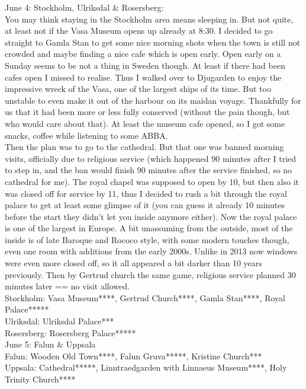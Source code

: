 June 4: Stockholm, Ulriksdal \& Rosersberg:\\
You may think staying in the Stockholm area means sleeping in. But not quite, at least not if the Vasa Museum opens up already at 8:30. I decided to go straight to Gamla Stan to get some nice morning shots when the town is still not crowded and maybe finding a nice cafe which is open early. Open early on a Sunday seems to be not a thing in Sweden though. At least if there had been cafes open I missed to realise. Thus I walked over to Djugarden to enjoy the impressive wreck of the Vasa, one of the largest ships of its time. But too unstable to even make it out of the harbour on its maidan voyage. Thankfully for us that it had been more or less fully conserved (without the pain though, but who would care about that). At least the museum cafe opened, so I got some snacks, coffee while listening to some ABBA.\\
Then the plan was to go to the cathedral. But that one was banned morning visits, officially due to religious service (which happened 90 minutes after I tried to step in, and the ban would finish 90 minutes after the service finished, so no cathedral for me). The royal chapel was supposed to open by 10, but then also it was closed off for service by 11, thus I decided to rush a bit through the royal palace to get at least some glimpse of it (you can guess it already 10 minutes before the start they didn't let you inside anymore either). Now the royal palace is one of the largest in Europe. A bit unassuming from the outside, most of the inside is of late Baroque and Rococo style, with some modern touches though, even one room with additions from the early 2000s. Unlike in 2013 now windows were even more closed off, so it all appeared a bit darker than 10 years previously. Then by Gertrud church the same game, religious service planned 30 minutes later == no visit allowed.\\

Stockholm: Vasa Museum****, Gertrud Church****, Gamla Stan****, Royal Palace*****\\
Ulriksdal: Ulriksdal Palace***\\
Rosersberg: Rosersberg Palace*****\\

June 5: Falun \& Uppsala\\

Falun: Wooden Old Town****, Falun Gruva*****, Kristine Church***\\
Uppsala: Cathedral*****, Linntraedgarden with Linnaeus Museum****, Holy Trinity Church****\\

